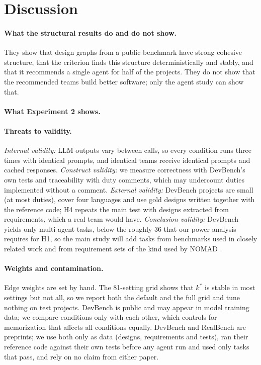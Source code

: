 \section{Discussion}\label{sec:discussion}
\label{sec:discussion}

\paragraph{What the structural results do and do not show.} They show that design graphs from a public benchmark have strong cohesive structure, that the criterion finds this structure deterministically and stably, and that it recommends a single agent for half of the projects. They do not show that the recommended teams build better software; only the agent study can show that.

\PilotDiscussion

\paragraph{What Experiment 2 shows.} \ExpTwoDiscussion \ExpTwoHTwoNote

\paragraph{Threats to validity.} \emph{Internal validity:} LLM outputs vary between calls, so every condition runs three times with identical prompts, and identical teams receive identical prompts and cached responses. \emph{Construct validity:} we measure correctness with DevBench's own tests and traceability with duty comments, which may undercount duties implemented without a comment. \emph{External validity:} DevBench projects are small (at most \DutyMax duties), cover four languages and use gold designs written together with the reference code; H4 repeats the main test with designs extracted from requirements, which a real team would have. \emph{Conclusion validity:} DevBench yields only \NMulti multi-agent tasks, below the roughly 36 that our power analysis requires for H1, so the main study will add tasks from benchmarks used in closely related work \citep{yang2026cocoder} and from requirement sets of the kind used by NOMAD \citep{giannouris2025nomad}. \ThreatExtra

\ExpTwoThreat

\paragraph{Weights and contamination.} Edge weights are set by hand. The 81-setting grid shows that $k^\ast$ is stable in most settings but not all, so we report both the default and the full grid and tune nothing on test projects. DevBench is public and may appear in model training data; we compare conditions only with each other, which controls for memorization that affects all conditions equally. DevBench and RealBench are preprints; we use both only as data (designs, requirements and tests), ran their reference code against their own tests before any agent run and used only tasks that pass, and rely on no claim from either paper.


